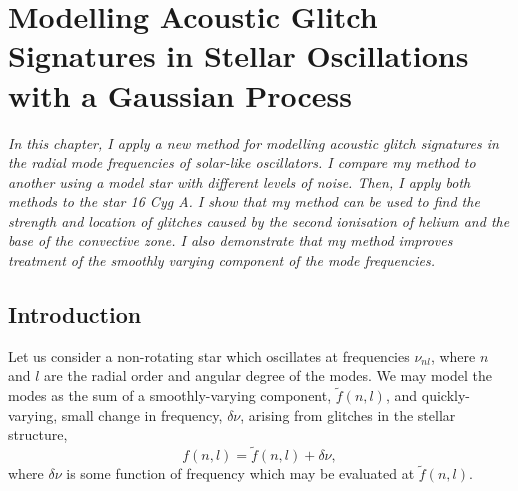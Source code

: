 %
%
%
%
%
\chapter[Modelling Acoustic Glitches with a Gaussian Process]{Modelling Acoustic Glitch Signatures in Stellar Oscillations with a Gaussian Process}\label{chap:glitch-gp}

\textit{In this chapter, I apply a new method for modelling acoustic glitch signatures in the radial mode frequencies of solar-like oscillators. I compare my method to another using a model star with different levels of noise. Then, I apply both methods to the star 16 Cyg A. I show that my method can be used to find the strength and location of glitches caused by the second ionisation of helium and the base of the convective zone. I also demonstrate that my method improves treatment of the smoothly varying component of the mode frequencies.}

\section{Introduction}

Let us consider a non-rotating star which oscillates at frequencies \(\nu_{nl}\), where \(n\) and \(l\) are the radial order and angular degree of the modes. We may model the modes as the sum of a smoothly-varying component, \(\tilde{f}(n, l)\), and quickly-varying, small change in frequency, \(\delta\nu\), arising from glitches in the stellar structure,
%
\begin{equation}
    f(n, l) = \tilde{f}(n, l) + \delta\nu,\label{eq:general-glitch}
\end{equation}
%
where \(\delta\nu\) is some function of frequency which may be evaluated at \(\tilde{f}(n, l)\).


